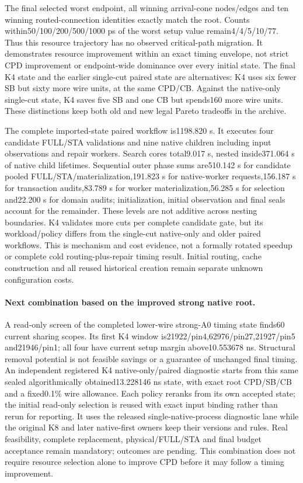The final selected worst endpoint, all winning arrival-cone nodes/edges and ten winning routed-connection identities exactly match the root. Counts within50/100/200/500/1000 ps of the worst setup value remain4/4/5/10/77. Thus this resource trajectory has no observed critical-path migration. It demonstrates resource improvement within an exact timing envelope, not strict CPD improvement or endpoint-wide dominance over every initial state. The final K4 state and the earlier single-cut paired state are alternatives: K4 uses six fewer SB but sixty more wire units, at the same CPD/CB. Against the native-only single-cut state, K4 saves five SB and one CB but spends160 more wire units. These distinctions keep both old and new legal Pareto tradeoffs in the archive.

The complete imported-state paired workflow is1198.820 s. It executes four candidate FULL/STA validations and nine native children including input observations and repair workers. Search cores total9.017 s, nested inside371.064 s of native child lifetimes. Sequential outer phase sums are510.142 s for candidate pooled FULL/STA/materialization,191.823 s for native-worker requests,156.187 s for transaction audits,83.789 s for worker materialization,56.285 s for selection and22.200 s for domain audits; initialization, initial observation and final seals account for the remainder. These levels are not additive across nesting boundaries. K4 validates more cuts per complete candidate gate, but its workload/policy differs from the single-cut native-only and older paired workflows. This is mechanism and cost evidence, not a formally rotated speedup or complete cold routing-plus-repair timing result. Initial routing, cache construction and all reused historical creation remain separate unknown configuration costs.

\paragraph{Next combination based on the improved strong native root.}
A read-only screen of the completed lower-wire strong-A0 timing state finds60 current sharing scopes. Its first K4 window is21922/pin4,62976/pin27,21927/pin5 and21946/pin1; all four have current setup margin above10.553678 ns. Structural removal potential is not feasible savings or a guarantee of unchanged final timing. An independent registered K4 native-only/paired diagnostic starts from this same sealed algorithmically obtained13.228146 ns state, with exact root CPD/SB/CB and a fixed0.1\% wire allowance. Each policy reranks from its own accepted state; the initial read-only selection is reused with exact input binding rather than rerun for reporting. It uses the released single-native-process diagnostic lane while the original K8 and later native-first owners keep their versions and rules. Real feasibility, complete replacement, physical/FULL/STA and final budget acceptance remain mandatory; outcomes are pending. This combination does not require resource selection alone to improve CPD before it may follow a timing improvement.
